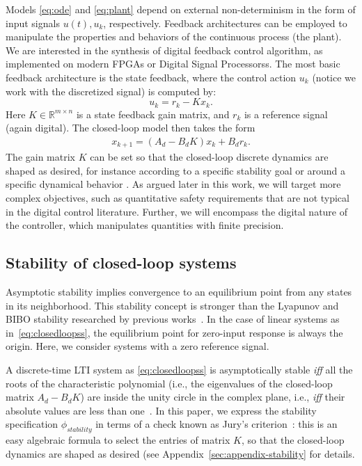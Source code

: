 \documentclass[runningheads,a4paper]{llncs}
\begin{document}
Models \eqref{eq:ode} and \eqref{eq:plant} depend on external non-determinism in the form of input signals $u (t), u_k$, respectively. 
Feedback architectures can be employed to manipulate the properties and behaviors of the continuous process (the plant).   
We are interested in the synthesis of digital feedback control algorithm, 
as implemented on modern FPGAs or Digital Signal Processorss. 
The most basic feedback architecture is the state feedback, 
where the control action $u_k$ (notice we work with the discretized signal) is computed by: 
%
\begin{equation}
\label{eq:controlaction}
u_k = r_{k} - K x_k. 
\end{equation}
%
Here $K \in \mathbb{R}^{m \times n}$ is a state feedback gain matrix, 
and $r_{k}$ is a reference signal (again digital).   
%
The closed-loop model then takes the form 
\begin{align}
\label{eq:closedloopss}
x_{k+1} = ( A_d - B_d K ) x_k + B_d r_k.
\end{align}
The gain matrix $K$ can be set so that the closed-loop discrete dynamics are shaped as desired, 
for instance according to a specific stability goal or around a specific dynamical behavior \cite{astrom1997computer}. 
As argued later in this work, we will target more complex objectives, such as quantitative safety requirements that are not typical in the digital control literature. 
Further, we will encompass the digital nature of the controller, which manipulates quantities with finite precision. 

\subsection{Stability of closed-loop systems}
\label{ssec:stability}


Asymptotic stability implies convergence to an equilibrium point from any states in its neighborhood. This stability concept is stronger than the Lyapunov and BIBO stability researched by previous works~\cite{DBLP:conf/emsoft/RavanbakhshS16,DBLP:journals/corr/AbateBCCDKK16,DBLP:conf/hybrid/RouxJG15,
DBLP:conf/hybrid/WangGRJF16}. In the case of linear systems as 
in~\eqref{eq:closedloopss}, the equilibrium point for zero-input 
response is always the  origin.  Here, we consider systems with 
a zero reference signal.

A discrete-time LTI system as \eqref{eq:closedloopss} is asymptotically stable
\textit{iff} all the roots of the characteristic polynomial (i.e., the
eigenvalues of the closed-loop matrix $A_d - B_d K$) are inside the unity
circle in the complex plane, i.e., \textit{iff} their absolute values are
less than one~\cite{astrom1997computer}.  In this paper, we express the
stability specification $\phi_{stability}$ in terms of a check known as
Jury's criterion~\cite{fadali}: this is an easy algebraic formula to select
the entries of matrix $K$, so that the closed-loop dynamics are shaped as
desired (see Appendix~\ref{sec:appendix-stability} for details.
\end{document}
